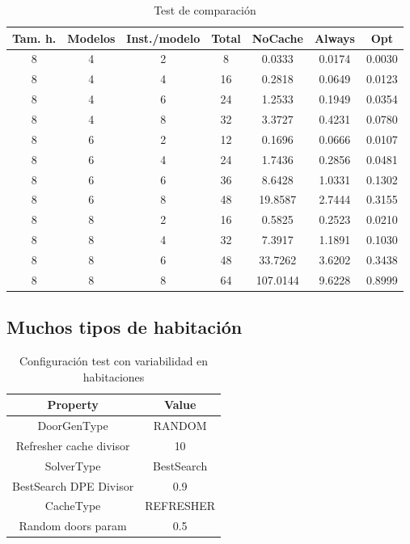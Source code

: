 \begin{table}[H]
\begin{center}
	\begin{tabular}{ | c | c | c | c | c | c | c | }
\hline
Tam. h. & Modelos & Inst./modelo & Total & NoCache & Always & Opt \\ \hline 
8 & 4 & 2 & 8 & 0.0333 & 0.0174 & 0.0030 \\ 
8 & 4 & 4 & 16 & 0.2818 & 0.0649 & 0.0123 \\ 
8 & 4 & 6 & 24 & 1.2533 & 0.1949 & 0.0354 \\ 
8 & 4 & 8 & 32 & 3.3727 & 0.4231 & 0.0780 \\ 
8 & 6 & 2 & 12 & 0.1696 & 0.0666 & 0.0107 \\ 
8 & 6 & 4 & 24 & 1.7436 & 0.2856 & 0.0481 \\ 
8 & 6 & 6 & 36 & 8.6428 & 1.0331 & 0.1302 \\ 
8 & 6 & 8 & 48 & 19.8587 & 2.7444 & 0.3155 \\ 
8 & 8 & 2 & 16 & 0.5825 & 0.2523 & 0.0210 \\ 
8 & 8 & 4 & 32 & 7.3917 & 1.1891 & 0.1030 \\ 
8 & 8 & 6 & 48 & 33.7262 & 3.6202 & 0.3438 \\ 
8 & 8 & 8 & 64 & 107.0144 & 9.6228 & 0.8999 \\ 
\hline
	\end{tabular}
\end{center}
\caption{Test de comparación}
\label{table:comp}
\end{table}




\subsection{Muchos tipos de habitación}

\begin{table}[H]
\begin{center}
	\begin{tabular}{ | c | c | }
\hline
 		Property & Value \\ \hline
DoorGenType & RANDOM \\ 
Refresher cache divisor & 10 \\ 
SolverType & BestSearch \\ 
BestSearch DPE Divisor & 0.9 \\ 
CacheType & REFRESHER \\ 
Random doors param & 0.5 \\ 
\hline
	\end{tabular}
\end{center}
\caption{Configuración test con variabilidad en habitaciones}
\label{table:cfg-optvarsample}
\end{table}


